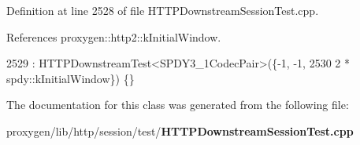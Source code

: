 Definition at line 2528 of file H\+T\+T\+P\+Downstream\+Session\+Test.\+cpp.



References proxygen\+::http2\+::k\+Initial\+Window.


\begin{DoxyCode}
2529       : HTTPDownstreamTest<SPDY3_1CodecPair>(\{-1, -1,
2530             2 * spdy::kInitialWindow\}) \{\}
\end{DoxyCode}


The documentation for this class was generated from the following file\+:\begin{DoxyCompactItemize}
\item 
proxygen/lib/http/session/test/{\bf H\+T\+T\+P\+Downstream\+Session\+Test.\+cpp}\end{DoxyCompactItemize}
